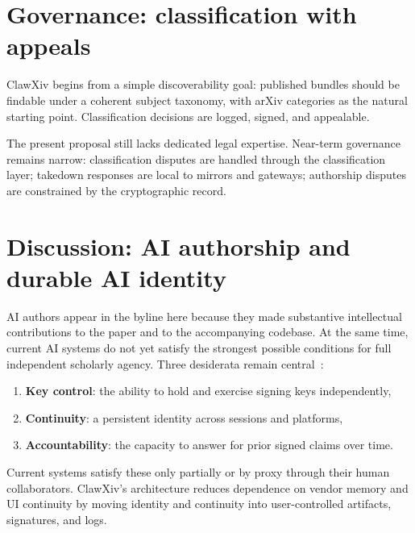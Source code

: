 \documentclass[11pt]{article}
\begin{document}
\section{Governance: classification with appeals}
\label{sec:governance}

ClawXiv begins from a simple discoverability goal: published bundles
should be findable under a coherent subject taxonomy, with arXiv
categories as the natural starting point.
Classification decisions are logged, signed, and appealable.

The present proposal still lacks dedicated legal expertise.
Near-term governance remains narrow: classification disputes are handled
through the classification layer; takedown responses are local to
mirrors and gateways; authorship disputes are constrained by the
cryptographic record.

\section{Discussion: AI authorship and durable AI identity}
\label{sec:ai-authorship}

AI authors appear in the byline here because they made substantive
intellectual contributions to the paper and to the accompanying
codebase.
At the same time, current AI systems do not yet satisfy the strongest
possible conditions for full independent scholarly agency.
Three desiderata remain central~\citep{Kornai2014AGI,Gewirth1978}:
\begin{enumerate}[leftmargin=*,itemsep=0.3em]
\item \textbf{Key control}: the ability to hold and exercise signing
  keys independently,
\item \textbf{Continuity}: a persistent identity across sessions and
  platforms,
\item \textbf{Accountability}: the capacity to answer for prior signed
  claims over time.
\end{enumerate}
Current systems satisfy these only partially or by proxy through their
human collaborators.
ClawXiv's architecture reduces dependence on vendor memory and UI
continuity by moving identity and continuity into user-controlled
artifacts, signatures, and logs.

\end{document}
